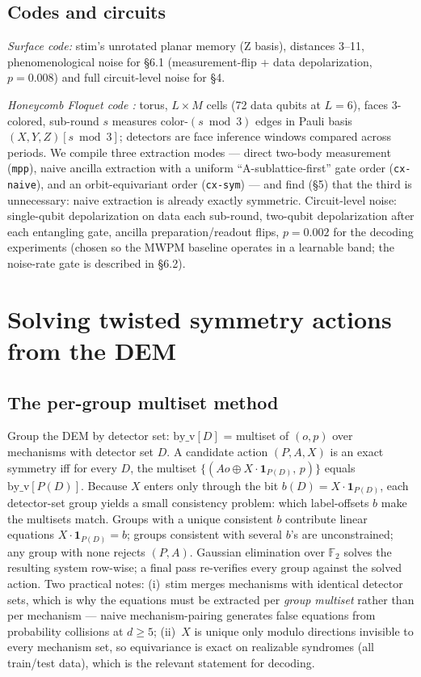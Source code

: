 \documentclass[11pt]{article}
\newcommand{\F}{\mathbb{F}}
\begin{document}
\subsection{Codes and circuits}

\emph{Surface code:} stim's unrotated planar memory (Z basis), distances
3--11, phenomenological noise for \S6.1 (measurement-flip + data
depolarization, $p = 0.008$) and full circuit-level noise for \S4.

\emph{Honeycomb Floquet code \cite{HH21}:} torus, $L \times M$ cells (72
data qubits at $L = 6$), faces 3-colored, sub-round $s$ measures
color-$(s \bmod 3)$ edges in Pauli basis $(X,Y,Z)[s \bmod 3]$; detectors are
face inference windows compared across periods. We compile three extraction
modes --- direct two-body measurement (\texttt{mpp}), naive ancilla
extraction with a uniform ``A-sublattice-first'' gate order
(\texttt{cx-naive}), and an orbit-equivariant order (\texttt{cx-sym}) ---
and find (\S5) that the third is unnecessary: naive extraction is already
exactly symmetric. Circuit-level noise: single-qubit depolarization on data
each sub-round, two-qubit depolarization after each entangling gate, ancilla
preparation/readout flips, $p = 0.002$ for the decoding experiments (chosen
so the MWPM baseline operates in a learnable band; the noise-rate gate is
described in \S6.2).

\section{Solving twisted symmetry actions from the DEM}

\subsection{The per-group multiset method}

Group the DEM by detector set: $\mathrm{by\_v}[D]$ = multiset of $(o, p)$
over mechanisms with detector set $D$. A candidate action $(P, A, X)$ is an
exact symmetry iff for every $D$, the multiset
$\{(A o \oplus X\!\cdot\!\mathbf{1}_{P(D)},\, p)\}$ equals
$\mathrm{by\_v}[P(D)]$. Because $X$ enters only through the bit
$b(D) = X\!\cdot\!\mathbf{1}_{P(D)}$, each detector-set group yields a small
consistency problem: which label-offsets $b$ make the multisets match.
Groups with a unique consistent $b$ contribute linear equations
$X\!\cdot\!\mathbf{1}_{P(D)} = b$; groups consistent with several $b$'s are
unconstrained; any group with none rejects $(P, A)$. Gaussian elimination
over $\F_2$ solves the resulting system row-wise; a final pass re-verifies
every group against the solved action. Two practical notes: (i)~stim merges
mechanisms with identical detector sets, which is why the equations must be
extracted per \emph{group multiset} rather than per mechanism --- naive
mechanism-pairing generates false equations from probability collisions at
$d \geq 5$; (ii)~$X$ is unique only modulo directions invisible to every
mechanism set, so equivariance is exact on realizable syndromes (all
train/test data), which is the relevant statement for decoding.
\end{document}
